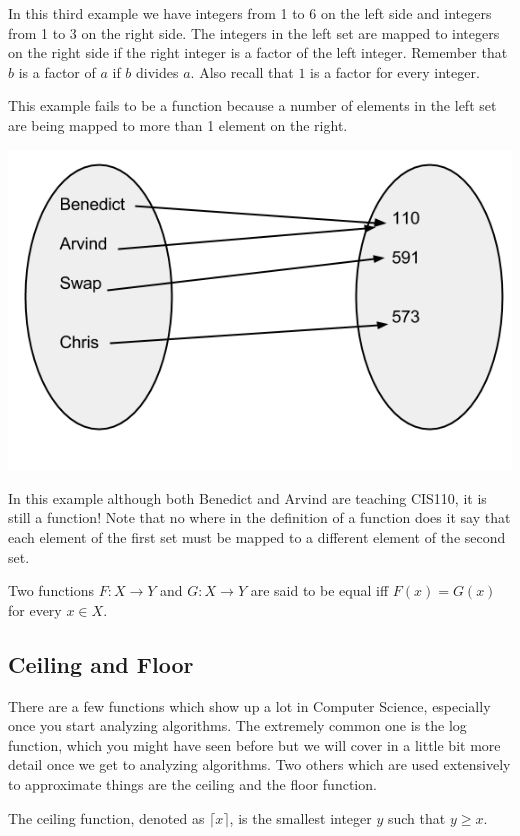 \documentclass[12pt]{article}
\begin{document}
In this third example we have integers from 1 to 6 on the left side and integers from 1 to 3 on the right side. 
The integers in the left set are mapped to integers on the right side if the right integer is a factor of the left integer. Remember that $b$ is a factor of $a$ if $b$ divides $a$. Also recall that $1$ is a factor for every integer.

This example fails to be a function because a number of elements in the left set are being mapped to more than 1 element on the right.

\includegraphics[scale=0.5]{stillAFunc.png}

In this example although both Benedict and Arvind are teaching CIS110, it is still a function! Note that no where in the definition of a function does it say that each element of the first set must be mapped to a different element of the second set.

Two functions $F: X \rightarrow Y$ and $G: X \rightarrow Y$ are said to be equal iff $F(x) = G(x)$ for every $x \in X$.

\subsection*{Ceiling and Floor}
There are a few functions which show up a lot in Computer Science, especially once you start analyzing algorithms. The extremely common one is the log function, which you might have seen before but we will cover in a little bit more detail once we get to analyzing algorithms.
Two others which are used extensively to approximate things are the ceiling and the floor function.

The ceiling function, denoted as $\lceil x \rceil$, is the smallest integer $y$ such that $y \ge x$. 
\end{document}
